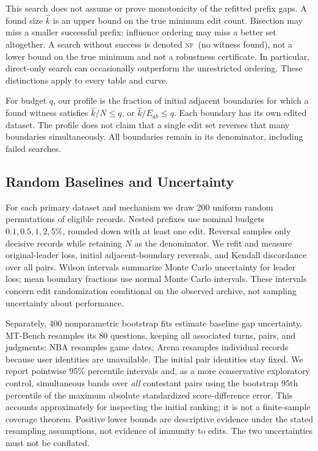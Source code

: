 \documentclass{article}
\newcommand{\NF}{\textsc{nf}}
\begin{document}
This search does not assume or prove monotonicity of the refitted prefix gaps. A found size $\widehat k$ is an upper bound on the true minimum edit count. Bisection may miss a smaller successful prefix; influence ordering may miss a better set altogether. A search without success is denoted \NF\ (no witness found), not a lower bound on the true minimum and not a robustness certificate. In particular, direct-only search can occasionally outperform the unrestricted ordering. These distinctions apply to every table and curve.

For budget $q$, our profile is the fraction of initial adjacent boundaries for which a found witness satisfies $\widehat k/N\le q$, or $\widehat k/E_{ab}\le q$. Each boundary has its own edited dataset. The profile does not claim that a single edit set reverses that many boundaries simultaneously. All boundaries remain in its denominator, including failed searches.

\subsection{Random Baselines and Uncertainty}
For each primary dataset and mechanism we draw 200 uniform random permutations of eligible records. Nested prefixes use nominal budgets $0.1,0.5,1,2,5\%$, rounded down with at least one edit. Reversal samples only decisive records while retaining $N$ as the denominator. We refit and measure original-leader loss, initial adjacent-boundary reversals, and Kendall discordance over all pairs. Wilson intervals summarize Monte Carlo uncertainty for leader loss; mean boundary fractions use normal Monte Carlo intervals. These intervals concern edit randomization conditional on the observed archive, not sampling uncertainty about performance.

Separately, 400 nonparametric bootstrap fits estimate baseline gap uncertainty. MT-Bench resamples its 80 questions, keeping all associated turns, pairs, and judgments; NBA resamples game dates; Arena resamples individual records because user identities are unavailable. The initial pair identities stay fixed. We report pointwise 95\% percentile intervals and, as a more conservative exploratory control, simultaneous bands over \emph{all} contestant pairs using the bootstrap 95th percentile of the maximum absolute standardized score-difference error. This accounts approximately for inspecting the initial ranking; it is not a finite-sample coverage theorem. Positive lower bounds are descriptive evidence under the stated resampling assumptions, not evidence of immunity to edits. The two uncertainties must not be conflated.
\end{document}
